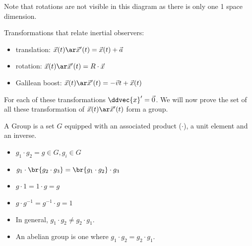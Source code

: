 \documentclass{article}
\begin{document}
\begin{center}
\end{center}

Note that rotations are not visible in this diagram as there is only one 1 space dimension.

Transformations that relate inertial observers:
\begin{itemize}
    \item translation: $\vec{x}(t) \ar \vec{x}'(t) = \vec{x}(t) + \vec{a}$
    \item rotation: $\vec{x}(t) \ar \vec{x}'(t) = R \cdot \vec{x}$
    \item Galilean boost: $\vec{x}(t) \ar \vec{x}'(t) = - \vec{v}t  + \vec{x}(t)$
\end{itemize}

For each of these transformations $\ddvec{x}' = \vec{0}$. We will now prove the set of all these transformation of $\vec{x}(t) \ar \vec{x}'(t)$ form a group.


A Group is a set $G$ equipped with an associated product ($\cdot$), a unit element and an inverse.

\begin{itemize}
    \item $g_1 \cdot g_2 = g \in G, g_i \in G$
    \item $g_1 \cdot \br{g_2 \cdot g_3} = \br{g_1 \cdot g_2} \cdot g_3$
    \item $g \cdot 1 = 1 \cdot g = g$
    \item $g \cdot g^{-1} = g^{-1} \cdot g = 1$
    \item In general, $g_1 \cdot g_2 \neq g_2 \cdot g_1$.
    \item An abelian group is one where $g_1 \cdot g_2 = g_2 \cdot g_1$.
\end{itemize}
\end{document}
